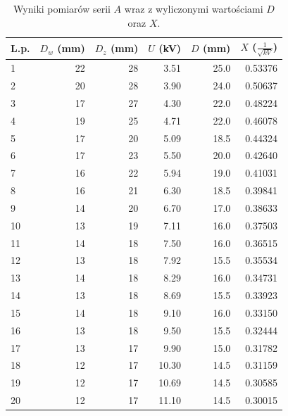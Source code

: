 \documentclass[a4paper]{article}
\begin{document}
\begin{table}
\centering

\begin{tabular}{lrrrrr}
\toprule
L.p. &  $D_w$ (mm) &  $D_z$ (mm) &  $U$ (kV) &  $D$ (mm) &  $X$ ($\frac{1}{\sqrt{kV}}$) \\
\midrule
1  &          22 &          28 &      3.51 &      25.0 &                     0.53376 \\
2  &          20 &          28 &      3.90 &      24.0 &                     0.50637 \\
3  &          17 &          27 &      4.30 &      22.0 &                     0.48224 \\
4  &          19 &          25 &      4.71 &      22.0 &                     0.46078 \\
5  &          17 &          20 &      5.09 &      18.5 &                     0.44324 \\
6  &          17 &          23 &      5.50 &      20.0 &                     0.42640 \\
7  &          16 &          22 &      5.94 &      19.0 &                     0.41031 \\
8  &          16 &          21 &      6.30 &      18.5 &                     0.39841 \\
9  &          14 &          20 &      6.70 &      17.0 &                     0.38633 \\
10 &          13 &          19 &      7.11 &      16.0 &                     0.37503 \\
11 &          14 &          18 &      7.50 &      16.0 &                     0.36515 \\
12 &          13 &          18 &      7.92 &      15.5 &                     0.35534 \\
13 &          14 &          18 &      8.29 &      16.0 &                     0.34731 \\
14 &          13 &          18 &      8.69 &      15.5 &                     0.33923 \\
15 &          14 &          18 &      9.10 &      16.0 &                     0.33150 \\
16 &          13 &          18 &      9.50 &      15.5 &                     0.32444 \\
17 &          13 &          17 &      9.90 &      15.0 &                     0.31782 \\
18 &          12 &          17 &     10.30 &      14.5 &                     0.31159 \\
19 &          12 &          17 &     10.69 &      14.5 &                     0.30585 \\
20 &          12 &          17 &     11.10 &      14.5 &                     0.30015 \\
\bottomrule
\end{tabular}

\caption{Wyniki pomiarów serii $A$ wraz z wyliczonymi wartościami $D$ oraz $X$.}
\label{seria_A}
\end{table}
\end{document}
